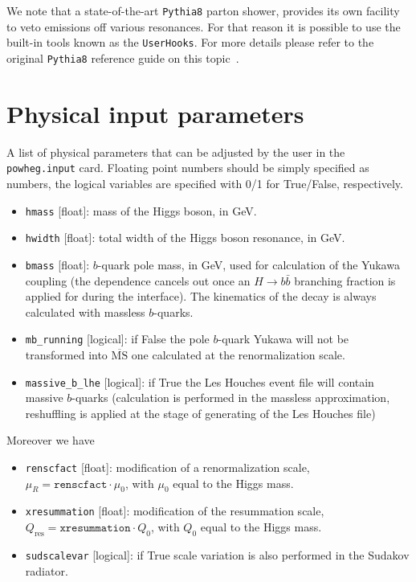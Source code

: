 \documentclass[11pt,a4paper]{article}\pdfoutput=1
\newcommand{\pythia}{{\texttt{Pythia8}}}
\newcommand{\Hbb}[1]{\ensuremath{H\to b\bar{b}{#1}}}
\newcommand{\gev}{\textrm{GeV}}
\begin{document}
We note that a state-of-the-art \pythia{} parton shower,
provides its own facility to veto emissions off various
resonances. For that reason it is possible to use the built-in tools
known as the \texttt{UserHooks}.
%
For more details please refer to the original \pythia{}
reference guide on this topic~\cite{Pythia8UserHooks,Pythia8POWHEG}.


\appendix
\section{Physical input parameters}
\label{app:input}
A list of physical parameters that can be adjusted by the user in the
\texttt{powheg.input} card. Floating point numbers should be simply
specified as numbers, the logical variables are specified with 0/1 for
True/False, respectively.

\begin{itemize}
\item \texttt{hmass} [float]: mass of the Higgs boson, in \gev{}.
\item \texttt{hwidth} [float]: total width of the Higgs boson resonance, in
  \gev{}.
\item \texttt{bmass} [float]: $b$-quark pole mass, in \gev{}, used for
  calculation of the Yukawa coupling (the dependence cancels out once
  an \Hbb{} branching fraction is applied for during the
  interface). The kinematics of the decay is always calculated with
  massless $b$-quarks.
\item \texttt{mb\_running} [logical]: if False the pole $b$-quark
  Yukawa will not be transformed into $\overline{\mathrm{MS}}$ one
  calculated at the renormalization scale.

\item \texttt{massive\_b\_lhe} [logical]: if True the Les Houches
  event file will contain massive $b$-quarks (calculation is performed
  in the massless approximation, reshuffling is applied at the stage
  of generating of the Les Houches file)
\end{itemize}

Moreover we have
\begin{itemize}
\item \texttt{renscfact} [float]: modification of a renormalization
  scale, $\mu_{R} = \texttt{renscfact} \cdot \mu_0$, with $\mu_0$
  equal to the Higgs mass.
\item \texttt{xresummation} [float]: modification of the resummation
  scale, $Q_{\text{res}} = \texttt{xresummation}\cdot Q_{0}$, with
  $Q_0$ equal to the Higgs mass.
\item \texttt{sudscalevar} [logical]: if True scale variation is also
  performed in the Sudakov radiator.
\end{itemize}
\end{document}

